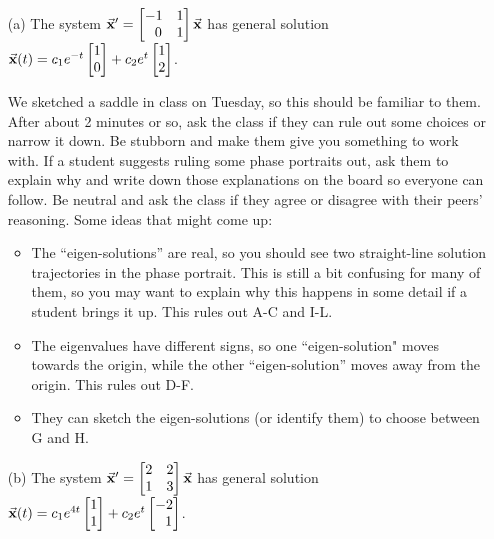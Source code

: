 \documentclass[epsf]{article}
\begin{document}
\begin{itemize}
\item[(a)] The system $\vec{\bf x}' = \begin{bmatrix}-1 & 1\cr\ \ 0 & 1 \end{bmatrix}\vec{\bf x}$ has general solution
$\vec{\bf x}(t) = c_1e^{-t}\begin{bmatrix}1 \cr0 \end{bmatrix} + c_2e^{t}\begin{bmatrix} 1 \cr 2 \end{bmatrix}$.

 We sketched a saddle in class on Tuesday, so this should be familiar to them.  After about 2 minutes or so, ask the class if they can rule out some choices or narrow it down.  Be stubborn and make them give you something to work with.  If a student suggests ruling some phase portraits out, ask them to explain why and write down those explanations on the board so everyone can follow.  Be neutral and ask the class if they agree or disagree with their peers' reasoning.  Some ideas that might come up:
\begin{itemize}
\item The ``eigen-solutions'' are real, so you should see two straight-line solution trajectories in the phase portrait.  This is still a bit confusing for many of them, so you may want to explain why this happens in some detail if a student brings it up.  This rules out A-C and I-L.
\item The eigenvalues have different signs, so one ``eigen-solution" moves towards the origin, while the other ``eigen-solution'' moves away from the origin.  This rules out D-F.
\item They can sketch the eigen-solutions (or identify them) to choose between G and H.
\end{itemize}

\item[(b)]  The system $\vec{\bf x}' = \begin{bmatrix}2 & 2\cr 1 & 3 \end{bmatrix}\vec{\bf x}$ has general solution
$\vec{\bf x}(t) = c_1e^{4t}\begin{bmatrix}1 \cr1 \end{bmatrix} + c_2e^{t}\begin{bmatrix} -2 \cr \ \ 1 \end{bmatrix}$.


\end{itemize}
\end{document}
